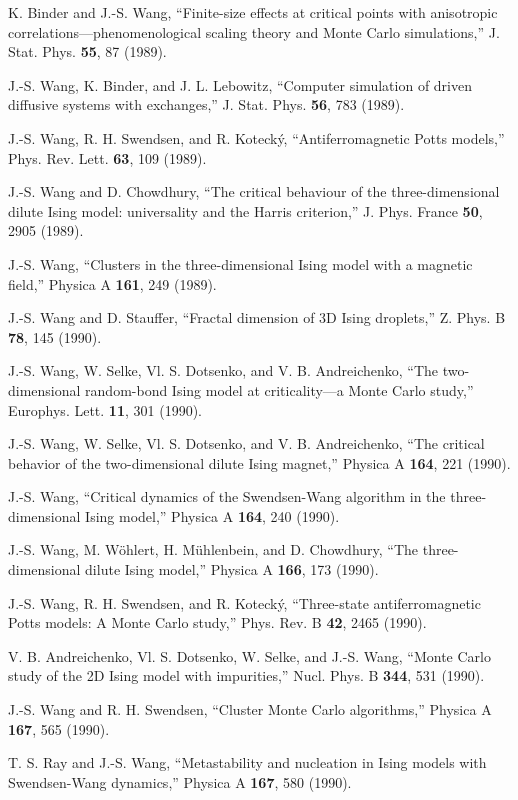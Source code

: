 \itm K. Binder and J.-S. Wang,  ``Finite-size effects at critical
  points with anisotropic correlations---phenomenological scaling
  theory and Monte Carlo simulations,''   J. Stat. Phys. {\bf 55}, 87
  (1989).
 
\itm J.-S. Wang, K. Binder, and J. L. Lebowitz, ``Computer
  simulation of driven diffusive systems with exchanges,''
  J. Stat. Phys. {\bf 56}, 783 (1989).
 
\itm J.-S. Wang, R. H. Swendsen, and R. Koteck\'{y},
  ``Antiferromagnetic Potts models,''
  Phys. Rev. Lett. {\bf 63}, 109 (1989).

\itm J.-S. Wang and D. Chowdhury, ``The critical behaviour of the
  three-dimensional dilute Ising model: universality and the
  Harris criterion,''  J. Phys. France {\bf 50}, 2905 (1989).
 
\itm J.-S. Wang, ``Clusters in the three-dimensional Ising model
  with a magnetic field,''  Physica A {\bf 161}, 249 (1989).
 
\itm J.-S.  Wang and D. Stauffer, ``Fractal dimension of 3D
  Ising droplets,'' Z. Phys. B {\bf 78}, 145 (1990).
  
\itm J.-S. Wang, W. Selke, Vl. S. Dotsenko, and V. B. Andreichenko,
  ``The two-dimensional random-bond Ising model at 
  criticality---a Monte Carlo study,'' Europhys. Lett. {\bf 11}, 301 (1990).
 
\itm J.-S. Wang, W. Selke, Vl. S. Dotsenko, and V. B. Andreichenko,
  ``The critical behavior of the two-dimensional dilute Ising magnet,''
  Physica A {\bf 164}, 221 (1990).
 
\itm J.-S. Wang, ``Critical dynamics of the
  Swendsen-Wang algorithm in the three-dimensional Ising model,''
  Physica A {\bf 164}, 240 (1990).
  
\itm J.-S. Wang, M. W\"ohlert, H. M\"uhlenbein, and D. Chowdhury,
  ``The three-dimensional dilute Ising model,''
  Physica A {\bf 166}, 173 (1990).

\itm J.-S. Wang, R. H. Swendsen, and R. Koteck\'{y},
  ``Three-state antiferromagnetic Potts models: A Monte Carlo study,''
  Phys. Rev. B {\bf 42}, 2465 (1990).

\itm V. B. Andreichenko, Vl. S. Dotsenko, W. Selke, and J.-S. Wang,
  ``Monte Carlo study of the 2D Ising model with impurities,''
  Nucl. Phys. B {\bf 344}, 531 (1990).
  
\itm J.-S. Wang and R. H. Swendsen, ``Cluster Monte Carlo algorithms,''
  Physica A {\bf 167}, 565 (1990).

\itm T. S. Ray and J.-S. Wang,  ``Metastability and nucleation in
  Ising models with Swendsen-Wang dynamics,'' 
  Physica A {\bf 167}, 580 (1990).

